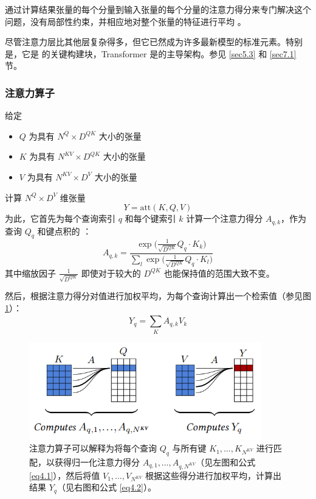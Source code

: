 通过计算结果张量的每个分量到输入张量的每个分量的注意力得分来专门解决这个问题，没有局部性约束，并相应地对整个张量的特征进行平均 \citep{arxiv-1706.03762}。

尽管注意力层比其他层复杂得多，但它已然成为许多最新模型的标准元素。特别是，它是  的关键构建块，Transformer 是的主导架构。参见 \ref{sec5.3} 和 \ref{sec7.1} 节。

\subsubsection*{注意力算子}

给定
\begin{itemize}
    \item $Q$ 为具有 $N^Q \times D^{QK}$ 大小的张量
    \item $K$ 为具有 $N^{KV} \times D^{QK}$ 大小的张量
    \item $V$ 为具有 $N^{KV} \times D^V$ 大小的张量
\end{itemize}
计算 $N^Q \times D^V$ 维张量
\[Y = \text{att}(K,Q,V)\]
为此，它首先为每个查询索引 $q$ 和每个键索引 $k$ 计算一个注意力得分 $A_{q,k}$，作为查询 $Q_q$ 和键点积的 ：
\begin{equation}
    A_{q,k} = \frac{\exp\Big(\frac{1}{\sqrt{D^{QK}}}Q_q \cdot K_k\Big)}{\sum_{l}^{}\exp\Big(\frac{1}{\sqrt{D^{QK}}}Q_q \cdot K_l\Big)} \label{eq4.1}
\end{equation}
其中缩放因子 $\frac{1}{\sqrt{D^{QK}}}$ 即使对于较大的 $D^{QK}$ 也能保持值的范围大致不变。

然后，根据注意力得分对值进行加权平均，为每个查询计算出一个检索值（参见图 \ref{fig4.11}）：
\begin{equation}
    Y_q = \sum_{K}^{}A_{q,k}V_k \label{eq4.2}
\end{equation}

\begin{figure}
    \centering
    \includegraphics[width=0.9\textwidth]{fig/fig4.11.png}
    \caption[注意力算子解析]{注意力算子可以解释为将每个查询 $Q_q$ 与所有键 $K_1, \dots ,K_{N^{KV}}$ 进行匹配，以获得归一化注意力得分 $A_{q,1}, \dots ,A_{q,N^{KV}}$（见左图和公式 \ref{eq4.1}），然后将值 $V_1, \dots ,V_{N^{KV}}$ 根据这些得分进行加权平均，计算出结果 $Y_q$（见右图和公式 \ref{eq4.2}）。}
    \label{fig4.11}
\end{figure}

